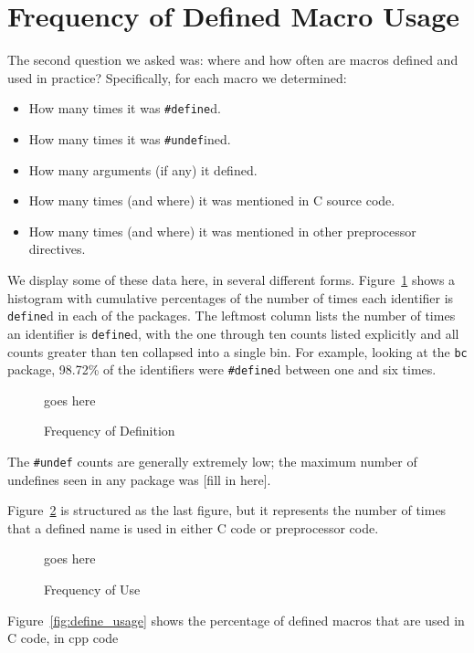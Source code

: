 \section{Frequency of Defined Macro Usage}\label{sec:usage}

The second question we asked was: where and how often are macros
defined and used in practice?  Specifically, for each macro we
determined:
\begin{itemize}

\item How many times it was \verb+#define+d.
\item How many times it was \verb+#undef+ined.
\item How many arguments (if any) it defined.
\item How many times (and where) it was mentioned in C source code.
\item How many times (and where) it was mentioned in other
preprocessor directives.

\end{itemize}

We display some of these data here, in several different forms.
Figure~\ref{fig:define_count} shows a histogram with cumulative
percentages of the number of times each identifier is \verb+define+d
in each of the packages.  The leftmost column lists the number of
times an identifier is \verb+define+d, with the one through ten counts
listed explicitly and all counts greater than ten collapsed into a
single bin.  For example, looking at the \verb+bc+ package, 98.72\% of
the identifiers were \verb+#define+d between one and six times.

\begin{figure}
goes here

\caption{Frequency of Definition\label{fig:define_count}}
\end{figure}

The \verb+#undef+ counts are generally extremely low; the maximum
number of undefines seen in any package was [fill in here].

Figure~\ref{fig:use_count} is structured as the last figure, but it
represents the number of times that a defined name is used in either C
code or preprocessor code.

\begin{figure}
goes here

\caption{Frequency of Use\label{fig:use_count}}
\end{figure}

Figure~\ref{fig:define_usage} shows the percentage of defined macros
that are used in C code, in cpp code

